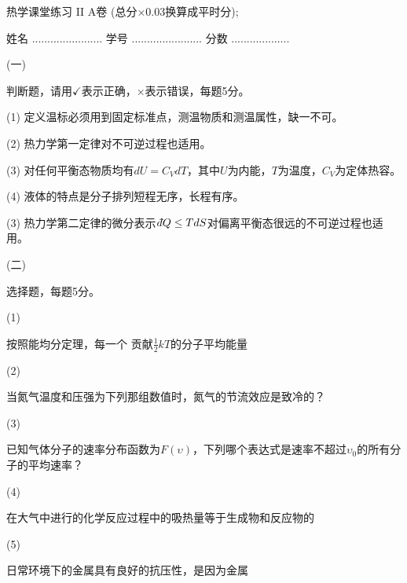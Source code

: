 \documentclass[12pt,CJK]{article}
\begin{document}
\bch
{\large 热学课堂练习 II A卷 (总分$\times 0.03$换算成平时分);}


姓名 ....................... {\hskip 0.5in}    学号 .......................{\hskip 0.5in}  分数 ...................


\bitem
\item[(一)]{判断题，请用$\checkmark$表示正确，$\times$表示错误，每题5分。

  \bitem
\item[(1)]{定义温标必须用到固定标准点，测温物质和测温属性，缺一不可。\bropt}
\item[(2)]{热力学第一定律对不可逆过程也适用。\bropt}
\item[(3)]{对任何平衡态物质均有$dU = C_VdT$，其中$U$为内能，$T$为温度，$C_V$为定体热容。\bropt}
\item[(4)]{液体的特点是分子排列短程无序，长程有序。\bropt}
\item[(3)]{热力学第二定律的微分表示$\dbar Q \le TdS$对偏离平衡态很远的不可逆过程也适用。\bropt}  

  \eitem
}

\item[(二)]{选择题，每题5分。

  \bitem

\item[(1)]{按照能均分定理，每一个 \bropt 贡献$\frac{1}{2}kT$的分子平均能量
  

}    
\item[(2)]{当氮气温度和压强为下列那组数值时，氮气的节流效应是致冷的？ \bropt
  

}


\item[(3)]{已知气体分子的速率分布函数为$F(\upsilon)$，下列哪个表达式是速率不超过$\upsilon_0$的所有分子的平均速率？
  \bropt

}
  

  \item[(4)]{
  在大气中进行的化学反应过程中的吸热量等于生成物和反应物的 \bropt


}

  \item[(5)]{
  日常环境下的金属具有良好的抗压性，是因为金属

}
  \eitem
}
\end{document}
